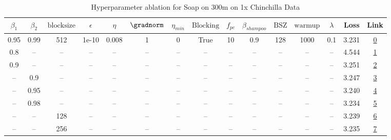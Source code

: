 \begin{table}[H]
\centering
\caption{Hyperparameter ablation for Soap on 300m on 1x Chinchilla Data}
\label{tab:ablation_soap_300m_on_1x_chinchilla_data}
\begin{tabular}{ccccccccccccccc}
\toprule
$\beta_1$ & $\beta_2$ & $\mathrm{block size}$ & $\epsilon$ & $\eta$ & $\gradnorm$ & $\eta_{min}$ & $\mathrm{Blocking}$ & $f_{pc}$ & $\beta_{shampoo}$ & $\mathrm{BSZ}$ & $\mathrm{warmup}$ & $\lambda$ & Loss & Link \\
\midrule
0.95 & 0.99 & 512 & 1e-10 & 0.008 & 1 & 0 & True & 10 & 0.9 & 128 & 1000 & 0.1 & 3.231 & \href{https://wandb.ai/stanford-mercury/optimizer-scaling/runs/sweep-300m-6B-soape63ad3blr0.008-wd0.1-minlr0-warmup1000-b10.95--02f063}{0} \\
\midrule
0.8 & -- & -- & -- & -- & -- & -- & -- & -- & -- & -- & -- & -- & 4.544 & \href{https://wandb.ai/stanford-mercury/optimizer-scaling/runs/sweep-300m-6B-soapec0ea31lr0.008-wd0.1-minlr0-warmup1000-b10.8-b-319d07}{1} \\
0.9 & -- & -- & -- & -- & -- & -- & -- & -- & -- & -- & -- & -- & 3.251 & \href{https://wandb.ai/stanford-mercury/optimizer-scaling/runs/sweep-300m-6B-soapee624e9lr0.008-wd0.1-minlr0-warmup1000-b10.9-b-ecd8c9}{2} \\
-- & 0.9 & -- & -- & -- & -- & -- & -- & -- & -- & -- & -- & -- & 3.247 & \href{https://wandb.ai/stanford-mercury/optimizer-scaling/runs/sweep-300m-6B-soapeb0ca30lr0.008-wd0.1-minlr0-warmup1000-b10.95--6cae1d}{3} \\
-- & 0.95 & -- & -- & -- & -- & -- & -- & -- & -- & -- & -- & -- & 3.240 & \href{https://wandb.ai/stanford-mercury/optimizer-scaling/runs/sweep-300m-6B-soape92b928lr0.008-wd0.1-minlr0-warmup1000-b10.95--140435}{4} \\
-- & 0.98 & -- & -- & -- & -- & -- & -- & -- & -- & -- & -- & -- & 3.234 & \href{https://wandb.ai/stanford-mercury/optimizer-scaling/runs/sweep-300m-6B-soape74fad0lr0.008-wd0.1-minlr0-warmup1000-b10.95--438330}{5} \\
-- & -- & 128 & -- & -- & -- & -- & -- & -- & -- & -- & -- & -- & 3.239 & \href{https://wandb.ai/stanford-mercury/optimizer-scaling/runs/sweep-300m-6B-soapef30d89lr0.008-wd0.1-minlr0-warmup1000-b10.95--88ca79}{6} \\
-- & -- & 256 & -- & -- & -- & -- & -- & -- & -- & -- & -- & -- & 3.235 & \href{https://wandb.ai/stanford-mercury/optimizer-scaling/runs/sweep-300m-6B-soape1270celr0.008-wd0.1-minlr0-warmup1000-b10.95--5fd15c}{7} \\

\end{tabular}
\end{table}
